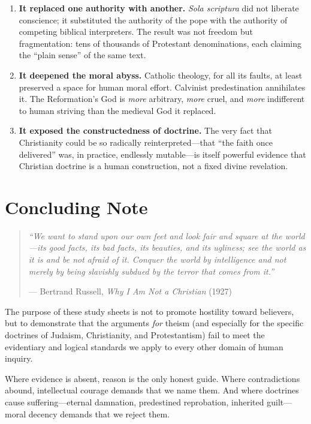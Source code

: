 \begin{enumerate}
  \item \textbf{It replaced one authority with another.}
    \textit{Sola scriptura} did not liberate conscience; it substituted the
    authority of the pope with the authority of
    competing biblical interpreters.  The result was not freedom but
    fragmentation: tens of thousands of Protestant
    denominations, each claiming the
    ``plain sense'' of the same text.

  \item \textbf{It deepened the moral abyss.}
    Catholic theology, for all its faults, at least preserved a space for
    human moral effort.  Calvinist predestination annihilates it.  The
    Reformation's God is \emph{more} arbitrary, \emph{more} cruel, and
    \emph{more} indifferent to human striving than the medieval God it
    replaced.

  \item \textbf{It exposed the constructedness of doctrine.}
    The very fact that Christianity could be so radically reinterpreted---that
    ``the faith once delivered'' was, in practice, endlessly mutable---is
    itself powerful evidence that Christian doctrine is a human
    construction, not a
    fixed divine revelation.
\end{enumerate}

\section*{Concluding Note}

\begin{quote}
\textit{``We want to stand upon our own feet and look fair and square at the
world---its good facts, its bad facts, its beauties, and its ugliness; see
the world as it is and be not afraid of it.  Conquer the world by
intelligence and not merely by being slavishly subdued by the terror that
comes from it.''}

\medskip
\hfill--- Bertrand Russell, \textit{Why I Am Not a Christian} (1927)
\end{quote}

The purpose of these study sheets is not to promote hostility toward
believers, but to demonstrate that the arguments \emph{for} theism (and
especially for the specific doctrines of Judaism, Christianity, and
Protestantism) fail to meet the evidentiary and logical standards we
apply to every other domain of human inquiry.

Where evidence is absent, reason is the only honest guide.  Where
contradictions abound, intellectual courage demands that we name them.  And
where doctrines cause suffering---eternal damnation, predestined reprobation,
inherited guilt---moral decency demands that we reject them.

\endgroup
